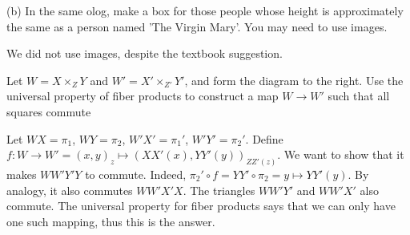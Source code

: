 \documentclass{article}
\begin{document}
\ans

\begin{center}
\end{center}

(b) In the same olog, make a box for those people whose height is approximately
the same as a person named 'The Virgin Mary'. You may need to use images.

\ans

\begin{center}
\end{center}

\unsure We did not use images, despite the textbook suggestion.


Let $W = X \times_Z Y$ and $W' = X' \times_{Z'} Y'$, and form the diagram
to the right. Use the universal property of fiber products to construct a map
$W \to W'$ such that all squares commute

\ans

Let $WX = \pi_1$, $WY = \pi_2$, $W'X' = \pi_1'$, $W'Y' = \pi_2'$.  Define $f: W
\to W' = (x,y)_z \mapsto (XX'(x),YY'(y))_{ZZ'(z)}$. We want to show that it
makes $WW'Y'Y$ to commute. Indeed, $\pi_2' \circ f = YY' \circ \pi_2 = y
\mapsto YY'(y)$.  By analogy, it also commutes $WW'X'X$. The triangles $WW'Y'$
and $WW'X'$ also commute. The universal property for fiber products says that
we can only have one such mapping, thus this is the answer.
\end{document}
